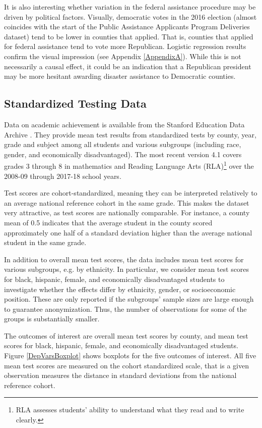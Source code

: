 It is also interesting whether variation in the federal assistance procedure may be driven by political factors. Visually, democratic votes in the 2016 election (almost coincides with the start of the Public Assistance Applicants Program Deliveries dataset) tend to be lower in counties that applied. That is, counties that applied for federal assistance tend to vote more Republican. Logistic regression results confirm the visual impression (see Appendix \ref{AppendixA}). While this is not necessarily a causal effect, it could be an indication that a Republican president may be more hesitant awarding disaster assistance to Democratic counties.


\subsection{Standardized Testing Data}

Data on academic achievement is available from the Stanford Education Data Archive \citep{SEDA}. They provide mean test results from standardized tests by county, year, grade and subject among all students and various subgroups (including race, gender, and economically disadvantaged). The most recent version 4.1 covers grades 3 through 8 in mathematics and Reading Language Arts (RLA)\footnote{RLA assesses students' ability to understand what they read and to write clearly.} over the 2008-09 through 2017-18 school years.

Test scores are cohort-standardized, meaning they can be interpreted relatively to an average national reference cohort in the same grade. This makes the dataset very attractive, as test scores are nationally comparable. For instance, a county mean of 0.5 indicates that the average student in the county scored approximately one half of a standard deviation higher than the average national student in the same grade.

In addition to overall mean test scores, the data includes mean test scores for various subgroups, e.g. by ethnicity. In particular, we consider mean test scores for black, hispanic, female, and economically disadvantaged students to investigate whether the effects differ by ethnicity, gender, or socioeconomic position. These are only reported if the subgroups' sample sizes are large enough to guarantee anonymization. Thus, the number of observations for some of the groups is substantially smaller.

The outcomes of interest are overall mean test scores by county, and mean test scores for black, hispanic, female, and economically disadvantaged students. Figure \ref{DepVarsBoxplot} shows boxplots for the five outcomes of interest. All five mean test scores are measured on the cohort standardized scale, that is a given observation measures the distance in standard deviations from the national reference cohort. 


